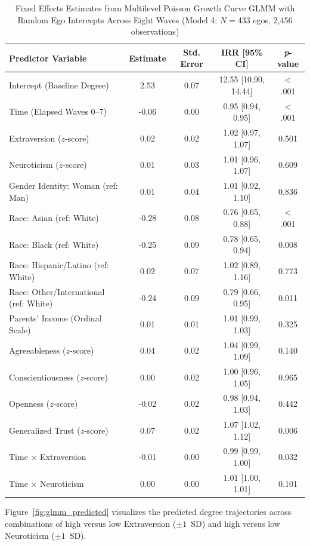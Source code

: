 \documentclass[12pt]{article}
\begin{document}
\begin{table}[htbp]
\centering
\small
\caption{Fixed Effects Estimates from Multilevel Poisson Growth Curve GLMM with Random Ego Intercepts Across Eight Waves (Model 4; $N = 433$ egos, 2,456 observations)}
\label{tab:glmm_appendix}
\begin{tabularx}{\linewidth}{Xcccc}
\toprule
\textbf{Predictor Variable} & \textbf{Estimate} & \textbf{Std. Error} & \textbf{IRR [95\% CI]} & \textbf{\textit{p}-value} \\
\midrule
Intercept (Baseline Degree) & 2.53 & 0.07 & 12.55 [10.90, 14.44] & $<$ .001 \\
Time (Elapsed Waves 0--7) & -0.06 & 0.00 & 0.95 [0.94, 0.95] & $<$ .001 \\
Extraversion ($z$-score) & 0.02 & 0.02 & 1.02 [0.97, 1.07] & 0.501 \\
Neuroticism ($z$-score) & 0.01 & 0.03 & 1.01 [0.96, 1.07] & 0.609 \\
Gender Identity: Woman (ref: Man) & 0.01 & 0.04 & 1.01 [0.92, 1.10] & 0.836 \\
Race: Asian (ref: White) & -0.28 & 0.08 & 0.76 [0.65, 0.88] & $<$ .001 \\
Race: Black (ref: White) & -0.25 & 0.09 & 0.78 [0.65, 0.94] & 0.008 \\
Race: Hispanic/Latino (ref: White) & 0.02 & 0.07 & 1.02 [0.89, 1.16] & 0.773 \\
Race: Other/International (ref: White) & -0.24 & 0.09 & 0.79 [0.66, 0.95] & 0.011 \\
Parents' Income (Ordinal Scale) & 0.01 & 0.01 & 1.01 [0.99, 1.03] & 0.325 \\
Agreeableness ($z$-score) & 0.04 & 0.02 & 1.04 [0.99, 1.09] & 0.140 \\
Conscientiousness ($z$-score) & 0.00 & 0.02 & 1.00 [0.96, 1.05] & 0.965 \\
Openness ($z$-score) & -0.02 & 0.02 & 0.98 [0.94, 1.03] & 0.442 \\
Generalized Trust ($z$-score) & 0.07 & 0.02 & 1.07 [1.02, 1.12] & 0.006 \\
Time $\times$ Extraversion & -0.01 & 0.00 & 0.99 [0.99, 1.00] & 0.032 \\
Time $\times$ Neuroticism & 0.00 & 0.00 & 1.01 [1.00, 1.01] & 0.101 \\
\bottomrule
\end{tabularx}
\end{table}

Figure~\ref{fig:glmm_predicted} visualizes the predicted degree trajectories across combinations of high versus low Extraversion ($\pm 1$~SD) and high versus low Neuroticism ($\pm 1$~SD).
\end{document}

